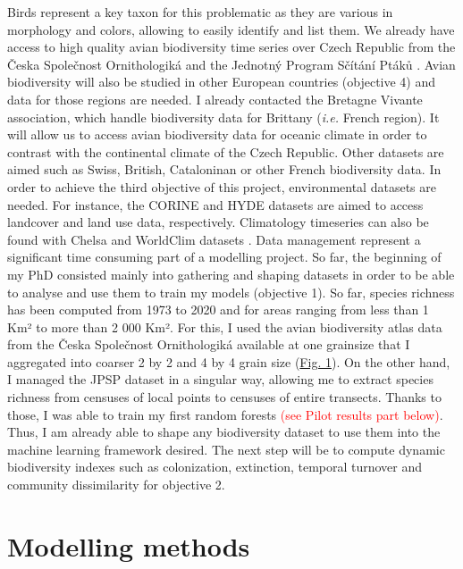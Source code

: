 \documentclass[
  12pt,
  oneside]{report}
\begin{document}
Birds represent a key taxon for this problematic as they are various in morphology and colors,
allowing to easily identify and list them. We already have access to high quality avian biodiversity
time series over Czech Republic from the Česka Společnost Ornithologiká \autocite{bejcek_velke_2016}
and the Jednotný Program Sčítání Ptáků \autocite[JPSP,][objective 1 and 2]{reif_population_2006}. Avian biodiversity
will also be studied in other European countries (objective 4) and data for those regions are needed. I
already contacted the Bretagne Vivante association, which handle biodiversity data for Brittany
(\emph{i.e.} French region). It will allow us to access avian biodiversity data for oceanic climate in order to
contrast with the continental climate of the Czech Republic. Other datasets are aimed such as Swiss,
British, Cataloninan or other French biodiversity data. In order to achieve the third objective of this
project, environmental datasets are needed. For instance, the CORINE and HYDE \autocite{goldewijk_hyde_2011} datasets are aimed to access landcover and land use data, respectively. Climatology
timeseries can also be found with Chelsa \autocite{karger_climatologies_2017,karger_data_2018} and WorldClim
datasets \autocite{fick_worldclim_2017}.
Data management represent a significant time consuming part of a modelling project. So far, the
beginning of my PhD consisted mainly into gathering and shaping datasets in order to
be able to analyse and use them to train my models (objective 1). So far, species richness has been computed
from 1973 to 2020 and for areas ranging from less than 1 Km² to more than 2 000 Km². For this, I
used the avian biodiversity atlas data from the Česka Společnost Ornithologiká available at one grainsize
that I aggregated into coarser 2 by 2 and 4 by 4 grain size (\href{https://github.com/FrsLry/IGA_figures/blob/main/maps_IGA.pdf}{Fig. 1}). On the other hand, I managed the
JPSP dataset in a singular way, allowing me to extract species richness from censuses of local points
to censuses of entire transects. Thanks to those, I was able to train my first random forests \textcolor{red}{(see Pilot
results part below)}. Thus, I am already able to shape any biodiversity dataset to use them into the
machine learning framework desired. The next step will be to compute dynamic biodiversity indexes
such as colonization, extinction, temporal turnover and community dissimilarity for objective 2.

\hypertarget{modelling-methods}{%
\section{Modelling methods}\label{modelling-methods}}
\end{document}
